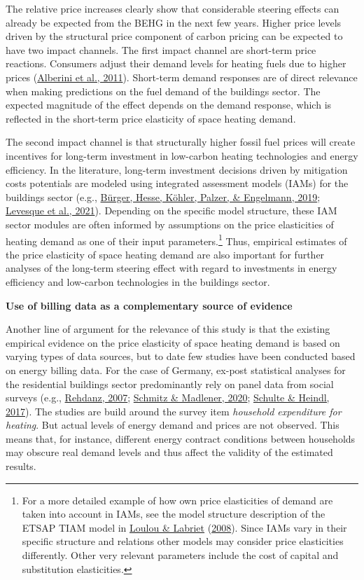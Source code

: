 \documentclass[12pt,twoside]{reedthesis}
\begin{document}
The relative price increases clearly show that considerable steering effects can already be expected from the BEHG in the next few years. Higher price levels driven by the structural price component of carbon pricing can be expected to have two impact channels. The first impact channel are short-term price reactions. Consumers adjust their demand levels for heating fuels due to higher prices (\protect\hyperlink{ref-alberini_etal11}{Alberini et al., 2011}). Short-term demand responses are of direct relevance when making predictions on the fuel demand of the buildings sector. The expected magnitude of the effect depends on the demand response, which is reflected in the short-term price elasticity of space heating demand.

The second impact channel is that structurally higher fossil fuel prices will create incentives for long-term investment in low-carbon heating technologies and energy efficiency. In the literature, long-term investment decisions driven by mitigation costs potentials are modeled using integrated assessment models (IAMs) for the buildings sector (e.g., \protect\hyperlink{ref-burger_etal19}{Bürger, Hesse, Köhler, Palzer, \& Engelmann, 2019}; \protect\hyperlink{ref-levesque_etal21}{Levesque et al., 2021}). Depending on the specific model structure, these IAM sector modules are often informed by assumptions on the price elasticities of heating demand as one of their input parameters.\footnote{For a more detailed example of how own price elasticities of demand are taken into account in IAMs, see the model structure description of the ETSAP TIAM model in \protect\hyperlink{ref-loulou_labriet08}{Loulou \& Labriet} (\protect\hyperlink{ref-loulou_labriet08}{2008}). Since IAMs vary in their specific structure and relations other models may consider price elasticities differently. Other very relevant parameters include the cost of capital and substitution elasticities.} Thus, empirical estimates of the price elasticity of space heating demand are also important for further analyses of the long-term steering effect with regard to investments in energy efficiency and low-carbon technologies in the buildings sector.

\textbf{Use of billing data as a complementary source of evidence}

Another line of argument for the relevance of this study is that the existing empirical evidence on the price elasticity of space heating demand is based on varying types of data sources, but to date few studies have been conducted based on energy billing data. For the case of Germany, ex-post statistical analyses for the residential buildings sector predominantly rely on panel data from social surveys (e.g., \protect\hyperlink{ref-rehdanz07}{Rehdanz, 2007}; \protect\hyperlink{ref-schmitz_madlener20}{Schmitz \& Madlener, 2020}; \protect\hyperlink{ref-schulte_heindl17}{Schulte \& Heindl, 2017}). The studies are build around the survey item \emph{household expenditure for heating}. But actual levels of energy demand and prices are not observed. This means that, for instance, different energy contract conditions between households may obscure real demand levels and thus affect the validity of the estimated results.
\end{document}
